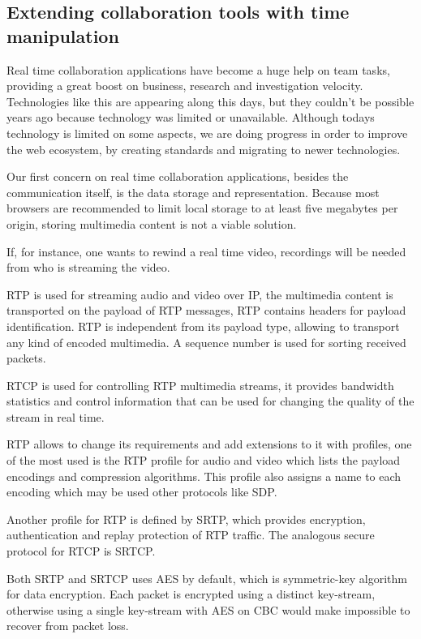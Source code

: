 \subsection{Extending collaboration tools with time manipulation}

 	Real time collaboration applications have become a huge help on team tasks, providing a great boost on business, research and investigation velocity. Technologies like this are appearing along this days, but they couldn't be possible years ago because technology was limited or unavailable. Although todays technology is limited on some aspects, we are doing progress in order to improve the web ecosystem, by creating standards and migrating to newer technologies.

 	Our first concern on real time collaboration applications, besides the communication itself, is the data storage and representation. Because most browsers are recommended to limit local storage to at least five megabytes per origin, storing multimedia content is not a viable solution.

	If, for instance, one wants to rewind a real time video, recordings will be needed from who is streaming the video. 

  \ac{RTP}\cite{rfc3550} is used for streaming audio and video over \ac{IP}, the multimedia content is transported on the payload of \ac{RTP} messages, \ac{RTP} contains headers for payload identification. \ac{RTP} is independent from its payload type, allowing to transport any kind of encoded multimedia. A sequence number is used for sorting received packets.

\ac{RTCP} is used for controlling \ac{RTP} multimedia streams, it provides bandwidth statistics and control information that can be used for changing the quality of the stream in real time.

  \ac{RTP} allows to change its requirements and add extensions to it with profiles, one of the most used is the \ac{RTP} profile for audio and video \cite{rfc3551} which lists the payload encodings and compression algorithms. This profile also assigns a name to each encoding which may be used other protocols like \ac{SDP}.

  Another profile for \ac{RTP} is defined by \ac{SRTP}, which provides encryption, authentication and replay protection of \ac {RTP} traffic. The analogous secure protocol for \ac{RTCP} is \ac{SRTCP}.

  Both \ac{SRTP} and \ac{SRTCP} uses \ac{AES} by default, which is symmetric-key algorithm for data encryption. Each packet is encrypted using a distinct key-stream, otherwise using a single key-stream with \ac{AES} on \ac{CBC} would make impossible to recover from packet loss.

